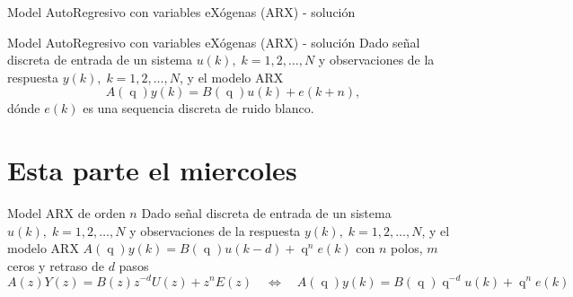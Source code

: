 \documentclass[presentation,aspectratio=169]{beamer}
\DeclareMathOperator{\shift}{q}
\begin{document}
\begin{frame}[label={sec:orgac6cf2d}]{Model AutoRegresivo con variables eXógenas (ARX) - solución}
\end{frame}
\begin{frame}[label={sec:org57dc41c}]{Model AutoRegresivo con variables eXógenas (ARX) - solución}
Dado señal discreta de entrada de un sistema \(u(k), \; k=1,2,\ldots, N\) y observaciones de la respuesta \(y(k), \; k=1,2,\ldots,N\), y el modelo ARX
\[ A(\shift) y(k) = B(\shift)u(k) + e(k+n),\]
dónde \(e(k)\) es una sequencia discreta de ruido blanco.
\begin{center}
\end{center}
\end{frame}



\section{Esta parte el miercoles}
\label{sec:orgb8acce3}
\begin{frame}[label={sec:org4bcdcf6}]{Model ARX de orden \(n\)}
Dado señal discreta de entrada de un sistema \(u(k), \; k=1,2,\ldots, N\) y observaciones de la respuesta \(y(k), \; k=1,2,\ldots,N\), y el modelo ARX \(A(\shift)y(k) = B(\shift)u(k-d) + \shift^n e(k)\) con \(n\) polos, \(m\) ceros y retraso de \(d\) pasos
\[A(z)Y(z) = B(z)z^{-d}U(z) + z^nE(z) \quad \Leftrightarrow \quad A(\shift)y(k) = B(\shift)\shift^{-d}u(k) + \shift^{n} e(k)\]
\end{frame}
\end{document}

